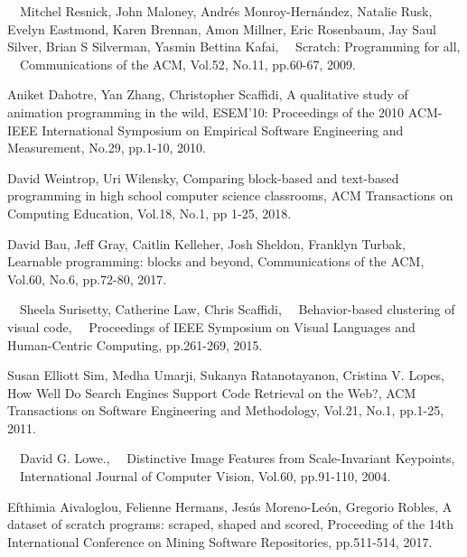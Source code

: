\documentclass[11pt]{jreport}
\begin{document}
 \begin{acknowledgements}
 \end{acknowledgements}


\begin{thebibliography}{99}

　Mitchel Resnick, John Maloney, Andr\'{e}s Monroy-Hern\'{a}ndez, Natalie Rusk, Evelyn Eastmond, Karen Brennan, 
    Amon Millner, Eric Rosenbaum, Jay Saul Silver, Brian S Silverman, Yasmin Bettina Kafai,
　Scratch: Programming for all,
　Communications of the ACM, Vol.52, No.11, pp.60-67, 2009.

    Aniket Dahotre, Yan Zhang, Christopher Scaffidi,
    A qualitative study of animation programming in the wild,
    ESEM'10: Proceedings of the 2010 ACM-IEEE International Symposium on Empirical Software Engineering and Measurement,
    No.29, pp.1-10, 2010.
    
    David Weintrop, Uri Wilensky,
    Comparing block-based and text-based programming in high school computer science classrooms,
    ACM Transactions on Computing Education, Vol.18, No.1, pp 1-25, 2018.
    
    David Bau, Jeff Gray, Caitlin Kelleher, Josh Sheldon, Franklyn Turbak,
    Learnable programming: blocks and beyond,
    Communications of the ACM, Vol.60, No.6, pp.72-80, 2017. 

　Sheela Surisetty, Catherine Law, Chris Scaffidi, 
　Behavior-based clustering of visual code,
　Proceedings of IEEE Symposium on Visual Languages and Human-Centric Computing, pp.261-269, 2015.

    Susan Elliott Sim, Medha Umarji, Sukanya Ratanotayanon, Cristina V. Lopes,
    How Well Do Search Engines Support Code Retrieval on the Web?,
    ACM Transactions on Software Engineering and Methodology, Vol.21, No.1, pp.1-25, 2011.

　David G. Lowe.,
　Distinctive Image Features from Scale-Invariant Keypoints,
　International Journal of Computer Vision, Vol.60, pp.91-110, 2004.


    Efthimia Aivaloglou, Felienne Hermans, Jes\'{u}s Moreno-Le\'{o}n, Gregorio Robles,
    A dataset of scratch programs: scraped, shaped and scored,
    Proceeding of the 14th International Conference on Mining Software Repositories, pp.511-514, 2017.
　
\end{thebibliography}
\end{document}
